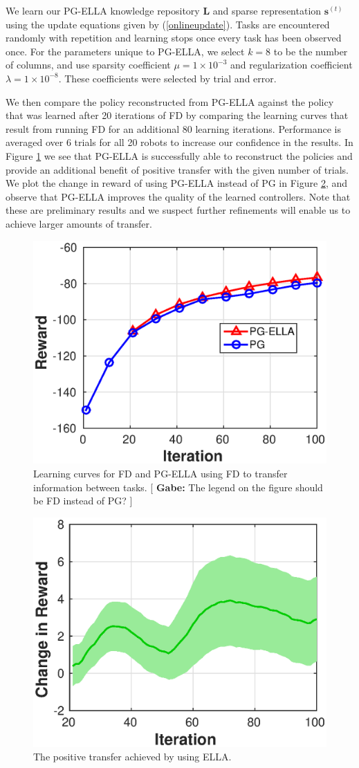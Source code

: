 \documentclass{aamas2016}
\newcommand{\note}[3]{{\color{#2} [ \ding{42} \textbf{#1:} {\small #3} ]}}
\newcommand{\comGabe}[1]{\note{Gabe}{cyan}{#1}}
\begin{document}
We learn our PG-ELLA knowledge repository $\bm{L}$ and sparse representation $\bm{s}^{(t)}$ using the update equations given 
by (\ref{onlineupdate}). Tasks are encountered randomly with repetition and learning stops once every task has been observed 
once. For the parameters unique to PG-ELLA, we select $k=8$ to be the number of columns, and use sparsity coefficient $\mu = 1\times 10^{-3}$ and regularization coefficient $\lambda = 1\times 10^{-8}$. These coefficients were selected by trial and error. 

We then compare the policy reconstructed from PG-ELLA against the policy that was learned after 20 iterations of FD by comparing the learning curves that result from running FD for an additional 80 learning iterations. Performance is averaged over 6 trials for all 20 robots to increase our confidence in the results. In Figure \ref{fig:reward} we see that PG-ELLA is successfully able to reconstruct the policies and provide an additional benefit of positive transfer with the given number of trials. We plot the change in reward of using PG-ELLA instead of PG in Figure \ref{fig:gain}, and observe that PG-ELLA improves the quality of the learned controllers. Note that these are preliminary results and we suspect further refinements will enable us to achieve larger amounts of transfer.

\begin{figure}[!htbp]
    \centering
        \includegraphics[width=.42\textwidth]{images/2016_02_06_learning.eps}
        \caption{Learning curves for FD and PG-ELLA using FD to transfer information between tasks. \comGabe{The legend on the figure should be FD instead of PG?} }\label{fig:reward}
\end{figure}

\begin{figure}[!htbp]
    \centering
        \includegraphics[width=.42\textwidth]{images/2016_02_06_gain.eps}
        \caption{The positive transfer achieved by using ELLA. }\label{fig:gain}
\end{figure}
\end{document}
